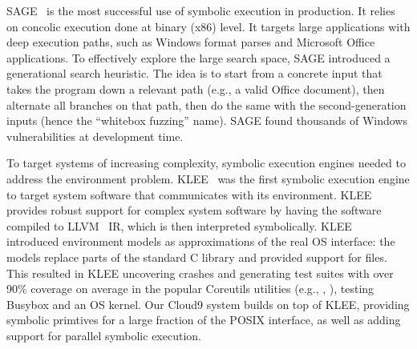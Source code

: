 



SAGE~\cite{sage2012,godefroid:fuzz} is the most successful use of symbolic execution in production.  It relies on concolic execution done at binary (x86) level.  It targets large applications with deep execution paths, such as Windows format parses and Microsoft Office applications.  To effectively explore the large search space, SAGE introduced a generational search heuristic.  The idea is to start from a concrete input that takes the program down a relevant path (e.g., a valid Office document), then alternate all branches on that path, then do the same with the second-generation inputs (hence the ``whitebox fuzzing'' name).
%
SAGE found thousands of Windows vulnerabilities at development time.



To target systems of increasing complexity, symbolic execution engines needed to address the environment problem.
%
KLEE~\cite{klee} was the first symbolic execution engine to target system software that communicates with its environment.  KLEE provides robust support for complex system software by having the software compiled to LLVM~\cite{llvm} IR, which is then interpreted symbolically.
%
KLEE~\cite{klee} introduced environment models as approximations of the real OS interface: the models replace parts of the standard C library and provided support for files.
%
This resulted in KLEE uncovering crashes and generating test suites with over 90\% coverage on average in the popular Coreutils utilities (e.g., , ), testing Busybox and an OS kernel.
%
Our Cloud9 system builds on top of KLEE, providing symbolic primtives for a large fraction of the POSIX interface, as well as adding support for parallel symbolic execution.

